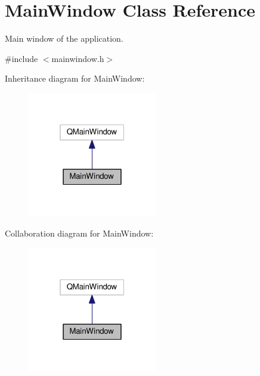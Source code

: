 \hypertarget{classMainWindow}{}\section{Main\+Window Class Reference}
\label{classMainWindow}


Main window of the application.  




{\ttfamily \#include $<$mainwindow.\+h$>$}



Inheritance diagram for Main\+Window\+:
\nopagebreak
\begin{figure}[H]
\begin{center}
\leavevmode
\includegraphics[width=160pt]{d1/d96/classMainWindow__inherit__graph}
\end{center}
\end{figure}


Collaboration diagram for Main\+Window\+:
\nopagebreak
\begin{figure}[H]
\begin{center}
\leavevmode
\includegraphics[width=160pt]{d2/d38/classMainWindow__coll__graph}
\end{center}
\end{figure}
